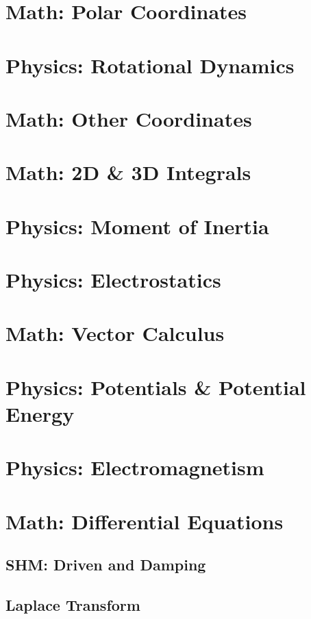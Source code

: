\documentclass{article}
\begin{document}
\section{Math: Polar Coordinates}
\section{Physics: Rotational Dynamics}

\section{Math: Other Coordinates}
\section{Math: 2D \& 3D Integrals}
\section{Physics: Moment of Inertia}
\section{Physics: Electrostatics}

\section{Math: Vector Calculus}
\section{Physics: Potentials \& Potential Energy}
\section{Physics: Electromagnetism}

\section{Math: Differential Equations}
\subsection{SHM: Driven and Damping}
\subsection{Laplace Transform}
\end{document}
